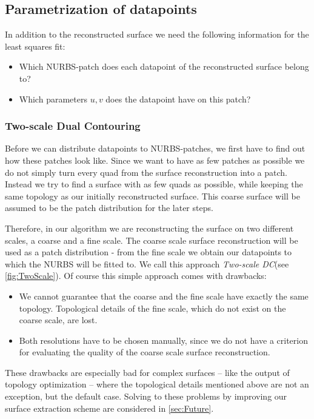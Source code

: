 \subsection{Parametrization of datapoints}
\label{ssec:parametrization}
In addition to the reconstructed surface we need the following information for the least squares fit: 
\begin{itemize}
\item Which \ac{NURBS}-patch does each datapoint of the reconstructed surface belong to?
\item Which parameters $u,v$ does the datapoint have on this patch?
\end{itemize}
\subsubsection{Two-scale Dual Contouring}
Before we can distribute datapoints to \ac{NURBS}-patches, we first have to find out how these patches look like. Since we want to have as few patches as possible we do not simply turn every \ac{quad} from the surface reconstruction into a patch. Instead  we try to find a surface with as few \acp{quad} as possible, while keeping the same topology as our initially reconstructed surface. This coarse surface will be assumed to be the patch distribution for the later steps.

Therefore, in our algorithm we are reconstructing the surface on two different scales, a coarse and a fine scale. The coarse scale surface reconstruction will be used as a patch distribution - from the fine scale we obtain our datapoints to which the \ac{NURBS} will be fitted to. We call this approach \emph{Two-scale \acl{DC}}(see \autoref{fig:TwoScale}).
Of course this simple approach comes with drawbacks:
\begin{itemize}
\item We cannot guarantee that the coarse and the fine scale have exactly the same topology. Topological details of the fine scale, which do not exist on the coarse scale, are lost.
\item Both resolutions have to be chosen manually, since we do not have a criterion for evaluating the quality of the coarse scale surface reconstruction.
\end{itemize}
These drawbacks are especially bad for complex surfaces -- like the output of topology optimization -- where the topological details mentioned above are not an exception, but the default case. Solving to these problems by improving our surface extraction scheme are considered in \autoref{sec:Future}.
